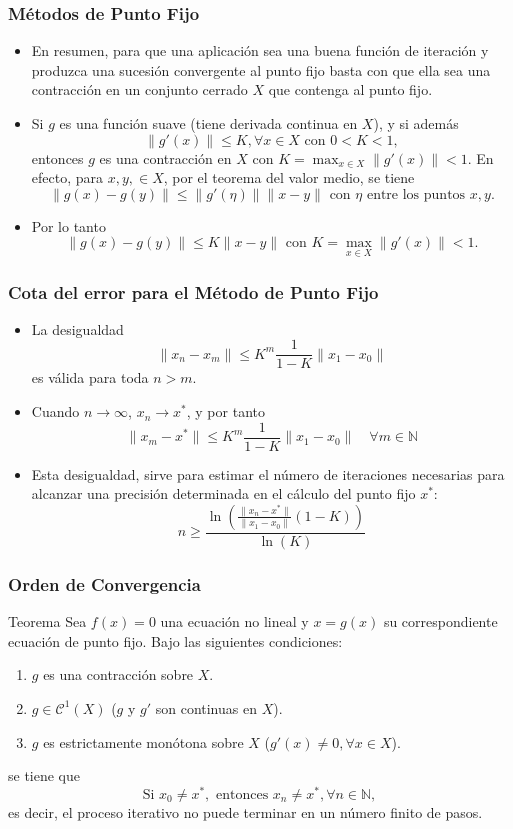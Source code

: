\documentclass{beamer}
\begin{document}
\begin{frame}
  \frametitle{M\'etodos de Punto Fijo}  
    \begin{itemize}
      \item<1-> En resumen, para que una aplicaci\'on sea una buena funci\'on de iteraci\'on y produzca una sucesi\'on convergente al
      punto fijo basta con que ella sea una contracci\'on en un conjunto cerrado $X$ que contenga al punto fijo.
      \item<2-> Si $g$ es una funci\'on suave (tiene derivada continua en $X$), y si adem\'as
      $$
      \|g'(x)\| \leq K, \forall x \in X \mbox{ con } 0 < K < 1 ,
      $$
      entonces $g$ es una contracci\'on en $X$ con $K = \max_{x \in X} \|g'(x)\| < 1$. En efecto, para $x, y, \in X$,
      por el teorema del valor medio, se tiene
      $$
      \|g(x) - g(y)\| \leq \|g'(\eta)\|\|x - y\| \mbox{ con $\eta$ entre los puntos $x, y$}.
      $$
      \item<3-> Por lo tanto
      $$
      \|g(x) - g(y)\| \leq K \|x - y\| \mbox{ con } K = \max_{x \in X} \|g'(x)\| < 1.
      $$      
    \end{itemize}  
\end{frame}
\begin{frame}
  \frametitle{Cota del error para el M\'etodo de Punto Fijo}
    \begin{itemize}
      \item<1-> La desigualdad
      $$
      \|x_n - x_m\| \leq K^m\frac{1}{1-K}\|x_1 - x_0\|
      $$
      es v\'alida para toda $n > m$. 
      \item<2-> Cuando $n \to \infty$, $x_n \to x^*$, y por
      tanto
      $$
      \|x_m - x^*\| \leq K^m\frac{1}{1-K}\|x_1 - x_0\| \quad \forall m \in \mathbb{N}
      $$
      \item<3-> Esta desigualdad, sirve para estimar el
      n\'umero de iteraciones necesarias para alcanzar una precisi\'on determinada en el c\'alculo del punto fijo $x^*$:
      $$
      n \geq \frac{\ln\left(\displaystyle\frac{\|x_n-x^*\|}{\|x_1-x_0\|}(1-K)\right)}{\ln(K)}
      $$      
    \end{itemize}
\end{frame}
\begin{frame}
  \frametitle{Orden de Convergencia}
  \begin{block}{Teorema}
    Sea $f (x) = 0$ una ecuaci\'on no lineal y $x = g(x)$ su correspondiente ecuaci\'on de punto fijo. Bajo las siguientes
condiciones:
\begin{enumerate}
 \item $g$ es una contracci\'on sobre $X$.
 \item $g \in \mathcal{C}^1(X)$ ($g$ y $g'$ son continuas en $X$).
 \item $g$ es estrictamente mon\'otona sobre $X$ ($g'(x) \neq 0 , \forall x  \in X$).
\end{enumerate}
se tiene que
$$
\mbox{Si } x_0 \neq x^*, \mbox{ entonces } x_n \neq x^* , \forall n \in \mathbb{N},
$$
es decir, el proceso iterativo no puede terminar en un n\'umero finito de pasos.
  \end{block}
\end{frame}
\end{document}
